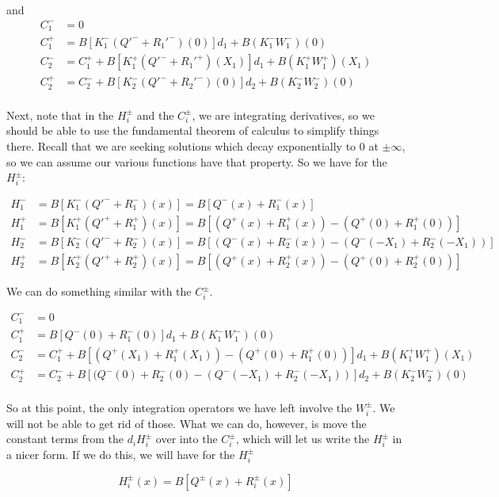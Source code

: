 \documentclass[12pt]{article}
\begin{document}
and
\begin{align*}
C_1^- &= 0 \\
C_1^+ &= B[ K_1^-(Q'^- + R_1'^-)(0)] d_1 + B(K_1^- W_1^-)(0) \\
C_2^- &= C_1^+ + B[ K_1^+(Q'^- + R_1'^+)(X_1)] d_1 + B(K_1^+ W_1^+)(X_1) \\
C_2^+ &= C_2^- + B[ K_2^-(Q'^- + R_2'^-)(0)] d_2 + B(K_2^- W_2^-)(0) \\
\end{align*}

Next, note that in the $H_i^\pm$ and the $C_i^\pm$, we are integrating derivatives, so we should be able to use the fundamental theorem of calculus to simplify things there. Recall that we are seeking solutions which decay exponentially to 0 at $\pm \infty$, so we can assume our various functions have that property. So we have for the $H_i^\pm$:

\begin{align*}
H_1^- &= B[ K_1^-(Q'^- + R_1^-)(x)] = B[Q^-(x) + R_1^-(x)] \\
H_1^+ &= B[ K_1^+(Q'^+ + R_1^+)(x)] = B[(Q^+(x) + R_1^+(x)) - (Q^+(0) + R_1^+(0)) ] \\
H_2^- &= B[ K_2^-(Q'^- + R_2^-)(x)] = B[(Q^-(x) + R_2^-(x)) - (Q^-(-X_1) + R_2^-(-X_1)) ] \\
H_2^+ &= B[ K_2^+(Q'^+ + R_2^+)(x)] = B[(Q^+(x) + R_2^+(x)) - (Q^+(0) + R_2^+(0)) ]
\end{align*}

We can do something similar with the $C_i^\pm$.

\begin{align*}
C_1^- &= 0 \\
C_1^+ &= B[ Q^-(0) + R_1^-(0)] d_1 + B(K_1^- W_1^-)(0) \\
C_2^- &= C_1^+ + B[ (Q^+(X_1) + R_1^+(X_1)) - (Q^+(0) + R_1^+(0))  ] d_1 + B(K_1^+ W_1^+)(X_1) \\
C_2^+ &= C_2^- + B[ (Q^-(0) + R_2^-(0) - (Q^-(-X_1) + R_2^-(-X_1)) ] d_2 + B(K_2^- W_2^-)(0) \\
\end{align*}

So at this point, the only integration operators we have left involve the $W_i^\pm$. We will not be able to get rid of those. What we can do, however, is move the constant terms from the $d_i H_i^\pm$ over into the $C_i^\pm$, which will let us write the $H_i^\pm$ in a nicer form. If we do this, we will have for the $H_i^\pm$

\[
H_i^\pm(x) = B[Q^\pm(x) + R_i^\pm(x)]
\]
\end{document}
